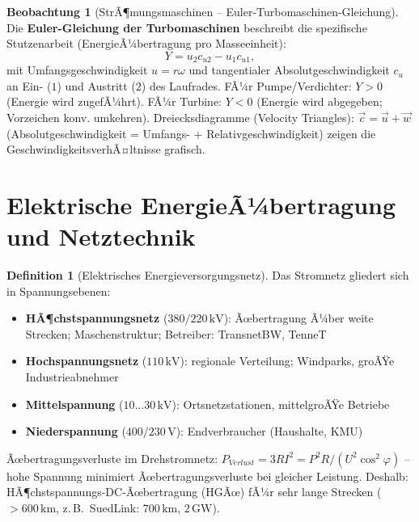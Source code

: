 ﻿\documentclass[a4paper,12pt]{report}
\theoremstyle{definition}
\newtheorem{definition}{Definition}
\newtheorem{beobachtung}{Beobachtung}
\begin{document}
\begin{beobachtung}[StrÃ¶mungsmaschinen -- Euler-Turbomaschinen-Gleichung]
Die \textbf{Euler-Gleichung der Turbomaschinen} beschreibt die spezifische
Stutzenarbeit (EnergieÃ¼bertragung pro Masseeinheit):
\[
  Y = u_2 c_{u2} - u_1 c_{u1},
\]
mit Umfangsgeschwindigkeit $u = r\omega$ und tangentialer Absolutgeschwindigkeit $c_u$
an Ein- ($1$) und Austritt ($2$) des Laufrades.
FÃ¼r Pumpe/Verdichter: $Y > 0$ (Energie wird zugefÃ¼hrt).
FÃ¼r Turbine: $Y < 0$ (Energie wird abgegeben; Vorzeichen konv. umkehren).
Dreiecksdiagramme (Velocity Triangles): $\vec{c} = \vec{u} + \vec{w}$
(Absolutgeschwindigkeit = Umfangs- + Relativgeschwindigkeit) zeigen
die GeschwindigkeitsverhÃ¤ltnisse grafisch.
\end{beobachtung}

\section{Elektrische EnergieÃ¼bertragung und Netztechnik}

\begin{definition}[Elektrisches Energieversorgungsnetz]
Das Stromnetz gliedert sich in Spannungsebenen:
\begin{itemize}
    \item[-] \textbf{HÃ¶chstspannungsnetz} ($380/220\,\mathrm{kV}$):
          Ãœbertragung Ã¼ber weite Strecken; Maschenstruktur; Betreiber: TransnetBW, TenneT
    \item[-] \textbf{Hochspannungsnetz} ($110\,\mathrm{kV}$):
          regionale Verteilung; Windparks, groÃŸe Industrieabnehmer
    \item[-] \textbf{Mittelspannung} ($10\ldots30\,\mathrm{kV}$):
          Ortsnetzstationen, mittelgroÃŸe Betriebe
    \item[-] \textbf{Niederspannung} ($400/230\,\mathrm{V}$):
          Endverbraucher (Haushalte, KMU)
\end{itemize}
Ãœbertragungsverluste im Drehstromnetz:
$P_{Verlust} = 3 R I^2 = P^2 R/(U^2\cos^2\!\varphi)$ --
hohe Spannung minimiert Ãœbertragungsverluste bei gleicher Leistung.
Deshalb: HÃ¶chstspannungs-DC-Ãœbertragung (HGÃœ) fÃ¼r sehr lange Strecken
($> 600\,\mathrm{km}$, z.\,B.\ SuedLink: $700\,\mathrm{km}$, $2\,\mathrm{GW}$).
\end{definition}
\end{document}
